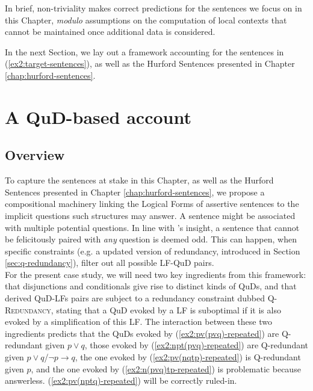 In brief, non-triviality makes correct predictions for the sentences we focus on in this Chapter, \textit{modulo} assumptions on the computation of local contexts that cannot be maintained once additional data is considered.

 
In the next Section, we lay out a framework accounting for the sentences in (\ref{ex2:target-sentences}), as well as the Hurford Sentences presented in Chapter \ref{chap:hurford-sentences}.






\section{A QuD-based account}\label{sec:my-account}
\subsection{Overview}
To capture the sentences at stake in this Chapter, as well as the Hurford Sentences presented in Chapter \ref{chap:hurford-sentences}, we propose a compositional machinery linking the Logical Forms of assertive sentences to the implicit questions such structures may answer. A sentence might be associated with multiple potential questions. In line with \citet{Katzir2015}'s insight, a sentence that cannot be felicitously paired with \textit{any} question is deemed odd. This can happen, when specific constraints (e.g. a updated version of redundancy, introduced in Section \ref{sec:q-redundancy}), filter out all possible LF-QuD pairs.\\

For the present case study, we will need two key ingredients from this framework: that disjunctions and conditionals give rise to distinct kinds of QuDs, and that derived QuD-LFs pairs are subject to a redundancy constraint dubbed \textsc{Q-Redundancy}, stating that a QuD evoked by a LF is suboptimal if it is also evoked by a simplification of this LF. The interaction between these two ingredients predicts that the QuDs evoked by (\ref{ex2:pv(pvq)-repeated}) are Q-redundant given $p\vee q$, those evoked by
(\ref{ex2:npt(pvq)-repeated}) are Q-redundant given $p \vee q$/$\neg p \rightarrow q$, the one evoked by (\ref{ex2:pv(nqtp)-repeated}) is Q-redundant given $p$, and the one evoked by (\ref{ex2:n(pvq)tp-repeated}) is problematic because answerless. (\ref{ex2:pv(nptq)-repeated}) will be correctly ruled-in.\\

